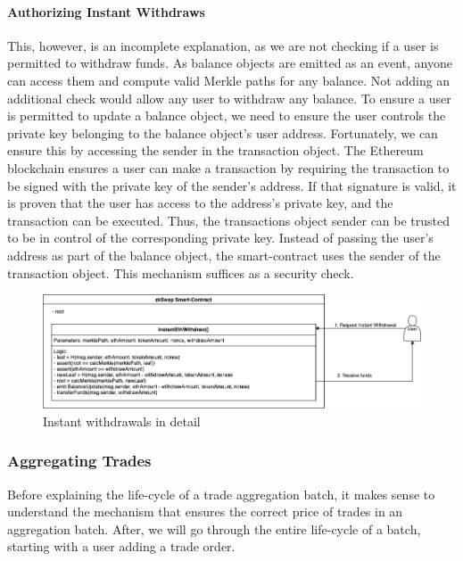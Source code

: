 \documentclass[../../thesis.tex]{subfiles}
\begin{document}
\paragraph{Authorizing Instant Withdraws}
This, however, is an incomplete explanation, as we are not checking if a user is permitted to withdraw funds. As balance objects are emitted as an event, anyone can access them and compute valid Merkle paths for any balance. Not adding an additional check would allow any user to withdraw any balance. To ensure a user is permitted to update a balance object, we need to ensure the user controls the private key belonging to the balance object's user address. Fortunately, we can ensure this by accessing the sender in the transaction object. The Ethereum blockchain ensures a user can make a transaction by requiring the transaction to be signed with the private key of the sender's address. If that signature is valid, it is proven that the user has access to the address's private key, and the transaction can be executed. Thus, the transactions object sender can be trusted to be in control of the corresponding private key. Instead of passing the user's address as part of the balance object, the smart-contract uses the sender of the transaction object. This mechanism suffices as a security check.

\begin{figure}[h]
    \centerline{\includegraphics[totalheight=3.7cm]{diagrams/instantWithdraw.png}}
    \caption{Instant withdrawals in detail}
    \label{fig:instWith}
\end{figure}

\subsubsection{Aggregating Trades}
Before explaining the life-cycle of a trade aggregation batch, it makes sense to understand the mechanism that ensures the correct price of trades in an aggregation batch. After, we will go through the entire life-cycle of a batch, starting with a user adding a trade order. 
\end{document}
